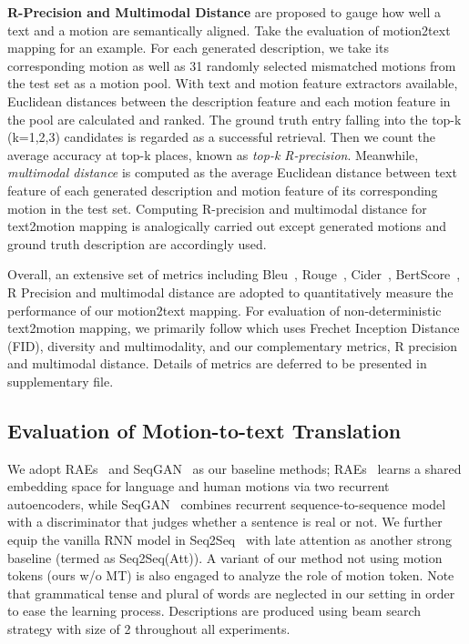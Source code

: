 \documentclass[runningheads]{llncs}
\newcommand{\beforesubsection}{\vspace{-2mm}}
\newcommand{\aftersubsection}{\vspace{-2mm}}
\begin{document}
\textbf{R-Precision and Multimodal Distance} are proposed to gauge how well a text and a motion are semantically aligned. Take the evaluation of motion2text mapping for an example. For each generated description, we take its corresponding motion as well as 31 randomly selected mismatched motions from the test set as a motion pool. With text and motion feature extractors available, Euclidean distances between the description feature and each motion feature in the pool are calculated and ranked. The ground truth entry falling into the top-k (k=1,2,3) candidates is regarded as a successful retrieval. Then we count the average accuracy at top-k places, known as \textit{top-k R-precision}. Meanwhile, \textit{multimodal distance} is computed as the average Euclidean distance between text feature of each generated description and motion feature of its corresponding motion in the test set. Computing R-precision and multimodal distance for text2motion mapping is analogically carried out except generated motions and ground truth description are accordingly used. 

Overall, an extensive set of metrics including Bleu~\cite{papineni2002bleu}, Rouge~\cite{lin2004rouge}, Cider~\cite{vedantam2015cider}, BertScore~\cite{zhang2019bertscore}, R Precision and multimodal distance are adopted to quantitatively measure the performance of our motion2text mapping. For evaluation of non-deterministic text2motion mapping, we primarily follow \cite{guo2022action2video} which uses Frechet Inception Distance (FID), diversity and multimodality, and our complementary metrics, R precision and multimodal distance. Details of metrics are deferred to be presented in supplementary file.


\beforesubsection
\subsection{Evaluation of Motion-to-text Translation}
\aftersubsection
\label{exp:motion-to-text}
We adopt RAEs~\cite{yamada2018paired} and SeqGAN~\cite{goutsu2021linguistic} as our baseline methods; RAEs~\cite{yamada2018paired} learns a shared embedding space for language and human motions via two recurrent autoencoders, while SeqGAN~\cite{goutsu2021linguistic} combines recurrent sequence-to-sequence model with a discriminator that judges whether a sentence is real or not. We further equip the vanilla RNN model in Seq2Seq~\cite{plappert2018learning} with late attention as another strong baseline (termed as Seq2Seq(Att)). A variant of our method not using motion tokens (ours w/o MT) is also engaged to analyze the role of motion token. Note that grammatical tense and plural of words are neglected in our setting in order to ease the learning process. Descriptions are produced using beam search strategy with size of 2 throughout all experiments.
\end{document}
